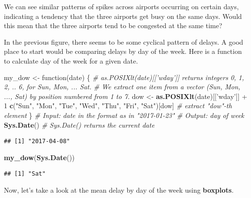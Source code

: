 \documentclass[]{book}
\newenvironment{Shaded}{\begin{snugshade}}{\end{snugshade}}
\newcommand{\KeywordTok}[1]{\textcolor[rgb]{0.13,0.29,0.53}{\textbf{{#1}}}}
\newcommand{\DecValTok}[1]{\textcolor[rgb]{0.00,0.00,0.81}{{#1}}}
\newcommand{\StringTok}[1]{\textcolor[rgb]{0.31,0.60,0.02}{{#1}}}
\newcommand{\CommentTok}[1]{\textcolor[rgb]{0.56,0.35,0.01}{\textit{{#1}}}}
\newcommand{\NormalTok}[1]{{#1}}
\theoremstyle{definition}
\theoremstyle{definition}
\theoremstyle{remark}
\begin{document}
We can see similar patterns of spikes across airports occurring on
certain days, indicating a tendency that the three airports get busy on
the same days. Would this mean that the three airports tend to be
congested at the same time?

In the previous figure, there seems to be some cyclical pattern of
delays. A good place to start would be comparing delays by day of the
week. Here is a function to calculate day of the week for a given date.

\begin{Shaded}
\begin{Highlighting}[]
\NormalTok{my_dow <-}\StringTok{ }\NormalTok{function(date) \{}
  \CommentTok{# as.POSIXlt(date)[['wday']] returns integers 0, 1, 2, .. 6, for Sun, Mon, ... Sat.  }
  \CommentTok{# We extract one item from a vector (Sun, Mon, ..., Sat) by position numbered from 1 to 7. }
  \NormalTok{dow <-}\StringTok{ }\KeywordTok{as.POSIXlt}\NormalTok{(date)[[}\StringTok{'wday'}\NormalTok{]] +}\StringTok{ }\DecValTok{1}
  \KeywordTok{c}\NormalTok{(}\StringTok{"Sun"}\NormalTok{, }\StringTok{"Mon"}\NormalTok{, }\StringTok{"Tue"}\NormalTok{, }\StringTok{"Wed"}\NormalTok{, }\StringTok{"Thu"}\NormalTok{, }\StringTok{"Fri"}\NormalTok{, }\StringTok{"Sat"}\NormalTok{)[dow]  }\CommentTok{# extract "dow"-th element    }
\NormalTok{\} }
  \CommentTok{# Input: date in the format as in "2017-01-23"}
  \CommentTok{# Output: day of week }
\KeywordTok{Sys.Date}\NormalTok{()  }\CommentTok{# Sys.Date() returns the current date }
\end{Highlighting}
\end{Shaded}

\begin{verbatim}
## [1] "2017-04-08"
\end{verbatim}

\begin{Shaded}
\begin{Highlighting}[]
\KeywordTok{my_dow}\NormalTok{(}\KeywordTok{Sys.Date}\NormalTok{()) }
\end{Highlighting}
\end{Shaded}

\begin{verbatim}
## [1] "Sat"
\end{verbatim}

Now, let's take a look at the mean delay by day of the week using
\textbf{boxplots}.
\end{document}
